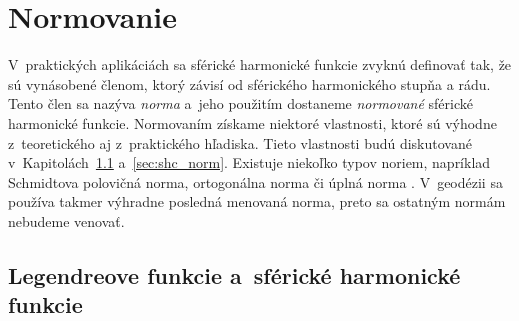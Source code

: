 \documentclass[a4paper,12pt]{book}
\begin{document}
\section{Normovanie}
\label{sec:normalization}

V~praktických aplikáciách sa sférické harmonické funkcie zvyknú definovať tak, 
že sú vynásobené členom, ktorý závisí od sférického harmonického stupňa a rádu.  
Tento člen sa nazýva \emph{norma} a~jeho použitím dostaneme \emph{normované} 
sférické harmonické funkcie.  Normovaním získame niektoré vlastnosti, ktoré sú 
výhodne z~teoretického aj z~praktického hľadiska.  Tieto vlastnosti budú 
diskutované v~Kapitolách~\ref{sec:leg_sh_norm} a~\ref{sec:shc_norm}.  Existuje 
niekoľko typov noriem, napríklad Schmidtova polovičná norma, ortogonálna norma 
či úplná norma \parencite{SHTOOLS}.  V~geodézii sa používa takmer výhradne 
posledná menovaná norma, preto sa ostatným normám nebudeme venovať.

\subsection{Legendreove funkcie a~sférické harmonické funkcie}
\label{sec:leg_sh_norm}
\end{document}
